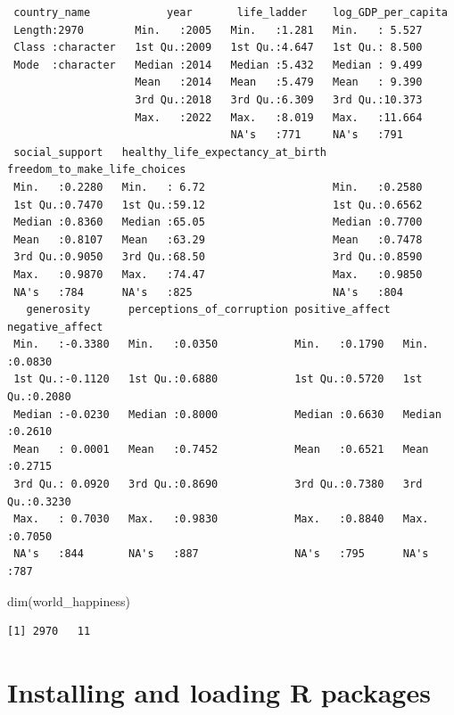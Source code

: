 \documentclass[
  letterpaper,
  DIV=11,
  numbers=noendperiod]{scrreprt}
\newenvironment{Shaded}{\begin{snugshade}}{\end{snugshade}}
\newcommand{\FunctionTok}[1]{\textcolor[rgb]{0.28,0.35,0.67}{#1}}
\newcommand{\NormalTok}[1]{\textcolor[rgb]{0.00,0.23,0.31}{#1}}
\begin{document}
\begin{verbatim}
 country_name            year       life_ladder    log_GDP_per_capita
 Length:2970        Min.   :2005   Min.   :1.281   Min.   : 5.527    
 Class :character   1st Qu.:2009   1st Qu.:4.647   1st Qu.: 8.500    
 Mode  :character   Median :2014   Median :5.432   Median : 9.499    
                    Mean   :2014   Mean   :5.479   Mean   : 9.390    
                    3rd Qu.:2018   3rd Qu.:6.309   3rd Qu.:10.373    
                    Max.   :2022   Max.   :8.019   Max.   :11.664    
                                   NA's   :771     NA's   :791       
 social_support   healthy_life_expectancy_at_birth freedom_to_make_life_choices
 Min.   :0.2280   Min.   : 6.72                    Min.   :0.2580              
 1st Qu.:0.7470   1st Qu.:59.12                    1st Qu.:0.6562              
 Median :0.8360   Median :65.05                    Median :0.7700              
 Mean   :0.8107   Mean   :63.29                    Mean   :0.7478              
 3rd Qu.:0.9050   3rd Qu.:68.50                    3rd Qu.:0.8590              
 Max.   :0.9870   Max.   :74.47                    Max.   :0.9850              
 NA's   :784      NA's   :825                      NA's   :804                 
   generosity      perceptions_of_corruption positive_affect  negative_affect 
 Min.   :-0.3380   Min.   :0.0350            Min.   :0.1790   Min.   :0.0830  
 1st Qu.:-0.1120   1st Qu.:0.6880            1st Qu.:0.5720   1st Qu.:0.2080  
 Median :-0.0230   Median :0.8000            Median :0.6630   Median :0.2610  
 Mean   : 0.0001   Mean   :0.7452            Mean   :0.6521   Mean   :0.2715  
 3rd Qu.: 0.0920   3rd Qu.:0.8690            3rd Qu.:0.7380   3rd Qu.:0.3230  
 Max.   : 0.7030   Max.   :0.9830            Max.   :0.8840   Max.   :0.7050  
 NA's   :844       NA's   :887               NA's   :795      NA's   :787     
\end{verbatim}

\begin{Shaded}
\begin{Highlighting}[]
\FunctionTok{dim}\NormalTok{(world\_happiness)}
\end{Highlighting}
\end{Shaded}

\begin{verbatim}
[1] 2970   11
\end{verbatim}

\section{Installing and loading R packages}\label{sec-readxl}
\end{document}
